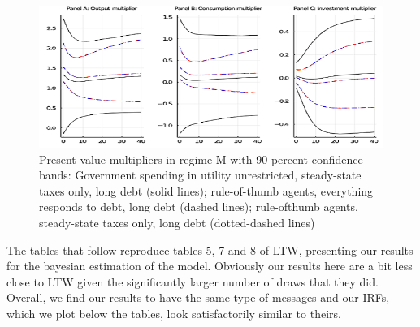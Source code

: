 \documentclass[letterpaper,12pt]{article}%
\begin{document}
\begin{figure}[H]
    \centering
    \includegraphics[width=12cm]{figure2.png}
    \caption{Present value multipliers in regime M with 90 percent confidence bands: Government spending in utility unrestricted, steady-state taxes
only, long debt (solid lines); rule-of-thumb agents, everything responds to debt, long debt (dashed lines); rule-ofthumb
agents, steady-state taxes only, long debt (dotted-dashed lines) }
    \label{fig:my_label}
\end{figure}

The tables that follow reproduce tables 5, 7 and 8 of LTW, presenting our results for the bayesian estimation of the model. Obviously our results here are a bit less close to LTW given the significantly larger number of draws that they did. Overall, we find our results to have the same type of messages and our IRFs, which we plot below the tables, look satisfactorily similar to theirs.
\end{document}
